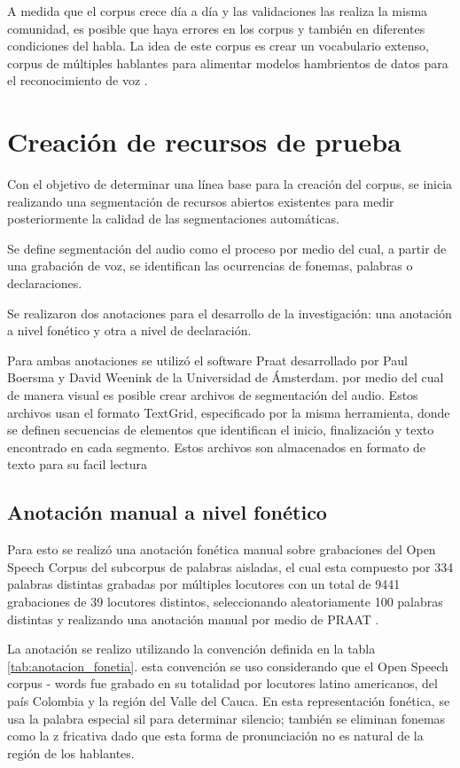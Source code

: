 \documentclass[a4paper,12pt,twoside]{report}
\begin{document}
A medida que el corpus crece día a día y las validaciones las realiza la misma comunidad, es posible que haya errores en los corpus y también en diferentes condiciones del habla. La idea de este corpus es crear un vocabulario extenso, corpus de múltiples hablantes para alimentar modelos hambrientos de datos para el reconocimiento de voz \cite{Common-Voice}.

\chapter{Creación de recursos de prueba}

Con el objetivo de determinar una línea base para la creación del corpus, se inicia realizando una segmentación de recursos abiertos existentes para medir posteriormente la calidad de las segmentaciones automáticas.

Se define segmentación del audio como el proceso por medio del cual, a partir de una grabación de voz, se identifican las ocurrencias de fonemas, palabras o declaraciones. 

Se realizaron dos anotaciones para el desarrollo de la investigación: una anotación a nivel fonético y otra a nivel de declaración.

Para ambas anotaciones se utilizó el software Praat \cite{Praat} desarrollado por Paul Boersma y David Weenink de la Universidad de Ámsterdam. por medio del cual de manera visual es posible crear archivos de segmentación del audio. Estos archivos usan el formato TextGrid, especificado por la misma herramienta, donde se definen secuencias de elementos que identifican el inicio, finalización y texto encontrado en cada segmento. Estos archivos son almacenados en formato de texto para su facil lectura \cite{TextGrids}

\section{Anotación manual a nivel fonético}

Para esto se realizó una anotación fonética manual sobre grabaciones del Open Speech Corpus \cite{Collazos2015} del subcorpus de palabras aisladas, el cual esta compuesto por 334 palabras distintas grabadas por múltiples locutores con un total de 9441 grabaciones de 39 locutores distintos, seleccionando aleatoriamente 100 palabras distintas y realizando una anotación manual por medio de PRAAT \cite{Praat}.

La anotación se realizo utilizando la convención definida en la tabla \ref{tab:anotacion_fonetia}. esta convención se uso considerando que el Open Speech corpus - words fue grabado en su totalidad por locutores latino americanos, del país Colombia y la región del Valle del Cauca. En esta representación fonética, se usa la palabra especial sil para determinar silencio; también se eliminan fonemas como la z fricativa dado que esta forma de pronunciación no es natural de la región de los hablantes.
\end{document}
